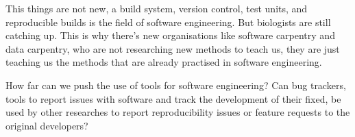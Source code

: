 This things are not new, a build system, version control, test units,
and reproducible builds is the field of software engineering.  But
biologists are still catching up.  This is why there's new
organisations like software carpentry and data carpentry, who are not
researching new methods to teach us, they are just teaching us the
methods that are already practised in software engineering.

How far can we push the use of tools for software engineering?  Can
bug trackers, tools to report issues with software and track the
development of their fixed, be used by other researches to report
reproducibility issues or feature requests to the original developers?
